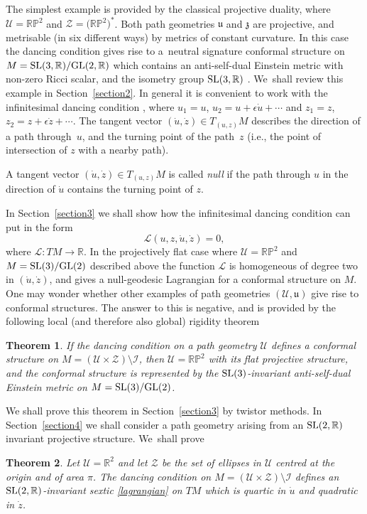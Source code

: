 \documentclass[pdftex]{sigma}%
\numberwithin{equation}{section}
\newtheorem{Theorem}{Theorem}[section]
\newcommand{\Z}{\mathbb{Z}}
\newcommand{\RP}{\mathbb{RP}}
\newcommand{\R}{\mathbb{R}}
\def\be{\begin{equation}}
\def\u{\mathfrak{u}}
\def\z{\mathfrak{z}}
\def\I{\mathcal{I}}
\def\ee{\end{equation}}
\renewcommand{\Z}{\mathcal{Z}}
\newcommand{\U}{\mathcal{U}}
\begin{document}
The simplest example is provided by the classical projective duality, where
$\U=\RP^2$ and $\Z=\big(\RP^2\big)^*$. Both path geometries
$\u$ and $\z$ are projective, and metrisable (in six different ways) by metrics
of constant curvature.
In this case the dancing condition gives rise
to a~neut\-ral signature conformal structure on $M={\rm SL}(3, \R)/{\rm GL}(2, \R)$ which contains
an anti-self-dual Einstein metric with non-zero Ricci scalar, and the isometry group ${\rm SL}(3, \R)$
\cite{bor,casey, DM}. We~shall review this example in Section~\ref{section2}. In general it is convenient to work
with
the infinitesimal dancing condition \cite{bor}, where
$u_1=u$, $u_2=u+\epsilon \dot{u}+\cdots$ and
$z_1=z$, $z_2=z+\epsilon\dot{z}+\cdots$. The tangent vector $(\dot{u}, \dot{z})\in T_{(u, z)}M$ describes
the direction of a path through~$u$, and the turning point of the
path~$z$ (i.e., the point of intersection of $z$ with a nearby path).
\begin{Definition}
\label{definull}
A tangent vector $(\dot{u}, \dot{z})\in T_{(u, z)}M$
is called
{\em null} if the path through $u$ in the direction of $\dot{u}$ contains the turning point of $z$.
\end{Definition}

In Section~\ref{section3} we shall show how the infinitesimal dancing condition can put in the form
\be
\label{lagrangian}
{\mathcal L}(u, z, \dot{u}, \dot{z})=0,
\ee
where ${\mathcal L}\colon TM\rightarrow \R$. In the projectively flat case where
$\U=\RP^2$ and $M={\rm SL}(3)/{\rm GL}(2)$ described above
the function ${\mathcal L}$ is homogeneous of degree two in $(\dot{u}, \dot{z})$, and gives a null-geodesic
Lagrangian for a conformal structure on $M$. One may wonder whether other examples of path geometries
$(\U, \u)$ give rise to conformal structures. The answer to this is negative,
and is provided by the following local (and therefore also global) rigidity
theorem
\begin{Theorem}
\label{theo_rigid}
If the dancing condition on a path geometry $\U$ defines a conformal structure
on $M=(\U\times \Z)\setminus {\mathcal I}$, then $\U=\RP^2$ with its flat projective
structure, and the conformal structure is represented by the
${\rm SL}(3)$-invariant anti-self-dual Einstein metric on $M={\rm SL}(3)/{\rm GL}(2)$.
\end{Theorem}

We shall prove this theorem in Section~\ref{section3} by twistor methods.
In Section~\ref{section4} we shall consider
a path geometry arising from an ${\rm SL}(2, \R)$ invariant projective structure. We~shall prove
\begin{Theorem}\label{theo_2}
Let $\U=\R^2$ and let $\Z$ be the set of ellipses in $\U$ centred at the origin and of area $\pi$.
The dancing condition on $M=(\U\times \Z)\setminus\I$ defines an ${\rm SL}(2, \R)$-invariant sextic
\eqref{lagrangian} on $TM$ which is quartic in $\dot{u}$ and quadratic in $\dot{z}$.
\end{Theorem}
\end{document}

